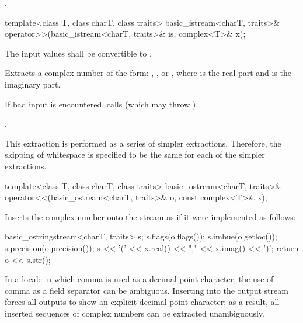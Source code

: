 \begin{itemdescr}
\pnum
\returns
{}.
\end{itemdescr}

%
\begin{itemdecl}
template<class T, class charT, class traits>
  basic_istream<charT, traits>& operator>>(basic_istream<charT, traits>& is, complex<T>& x);
\end{itemdecl}

\begin{itemdescr}
\pnum
\requires
The input values shall be convertible to
.

\pnum
\effects
Extracts a complex number  of the form:
,
,
or
,
where
is the real part and
is the imaginary part.

\pnum
If bad input is encountered, calls
(which may throw
).

\pnum
\returns
{}.

\pnum
\remarks
This extraction is performed as a series of simpler
extractions.
Therefore, the skipping of whitespace is specified to be
the same for each of the simpler extractions.
\end{itemdescr}

%
\begin{itemdecl}
template<class T, class charT, class traits>
  basic_ostream<charT, traits>& operator<<(basic_ostream<charT, traits>& o, const complex<T>& x);
\end{itemdecl}

\begin{itemdescr}
\pnum
\effects
Inserts the complex number 
onto the stream  as if it were implemented as follows:

\begin{codeblock}
basic_ostringstream<charT, traits> s;
s.flags(o.flags());
s.imbue(o.getloc());
s.precision(o.precision());
s << '(' << x.real() << "," << x.imag() << ')';
return o << s.str();
\end{codeblock}

\pnum
\begin{note}
In a locale in which comma is used as a decimal point character, the
use of comma as a field separator can be ambiguous. Inserting
 into the output stream forces all outputs to
show an explicit decimal point character; as a result, all inserted sequences of
complex numbers can be extracted unambiguously.
\end{note}
\end{itemdescr}

